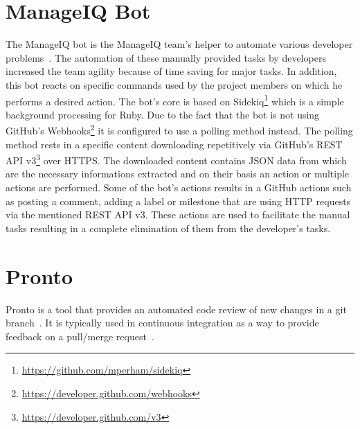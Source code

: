 \section{ManageIQ Bot}

The ManageIQ bot is the ManageIQ team's helper to automate various developer problems~\cite{MIQBOT}. The automation of these manually provided tasks by developers increased the team agility because of time saving for major tasks. In addition, this bot reacts on specific commands used by the project members on which he performs a desired action. The bot's core is based on Sidekiq\footnote{\url{https://github.com/mperham/sidekiq}} which is a simple background processing for Ruby. Due to the fact that the bot is not using GitHub's Webhooks\footnote{\url{https://developer.github.com/webhooks}} it is configured to use a polling method instead. The polling method rests in a specific content downloading repetitively via GitHub's REST API v3\footnote{\url{https://developer.github.com/v3}} over HTTPS. The downloaded content contains JSON data from which are the necessary informations extracted and on their basis an action or multiple actions are performed. Some of the bot's actions results in a GitHub actions such as posting a comment, adding a label or milestone that are using HTTP requests via the mentioned REST API v3. These actions are used to facilitate the manual tasks resulting in a complete elimination of them from the developer's tasks.

\section{Pronto}

Pronto is a tool that provides an automated code review of new changes in a git branch~\cite{PRONTO-1}. It is typically used in continuous integration as a way to provide feedback on a pull/merge request~\cite{PRONTO-1}.\\

